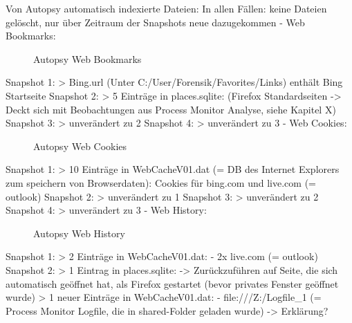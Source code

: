 Von Autopsy automatisch indexierte Dateien: 
In allen Fällen: keine Dateien gelöscht, nur über Zeitraum der Snapshots neue dazugekommen
- Web Bookmarks:
	\begin{figure}[h!]
		\centerline{}
		\label{chart:final-criteria}  
		\caption{Autopsy Web Bookmarks}
	\end{figure}
	Snapshot 1:
		> Bing.url (Unter C:/User/Forensik/Favorites/Links) enthält Bing Startseite
	Snapshot 2:
		> 5 Einträge in places.sqlite: (Firefox Standardseiten -> Deckt sich mit Beobachtungen aus Process Monitor Analyse, siehe Kapitel X)
	Snapshot 3:
		> unverändert zu 2
	Snapshot 4:
		> unverändert zu 3
- Web Cookies:
	\begin{figure}[h!]
		\centerline{}
		\label{chart:final-criteria}  
		\caption{Autopsy Web Cookies}
	\end{figure}
	Snapshot 1:
		> 10 Einträge in WebCacheV01.dat (= DB des Internet Explorers zum speichern von Browserdaten): Cookies für bing.com und live.com (= outlook)
	Snapshot 2:
		> unverändert zu 1
	Snapshot 3:
		> unverändert zu 2
	Snapshot 4:
		> unverändert zu 3
- Web History:
	\begin{figure}[h!]
		\centerline{}
		\label{chart:final-criteria}  
		\caption{Autopsy Web History}
	\end{figure}
	Snapshot 1:
		> 2 Einträge in WebCacheV01.dat:
			- 2x live.com (= outlook)
	Snapshot 2:
		> 1 Eintrag in places.sqlite: %
			-> Zurückzuführen auf Seite, die sich automatisch geöffnet hat, als Firefox gestartet (bevor privates Fenster geöffnet wurde)
		> 1 neuer Einträge in WebCacheV01.dat:
			- file:///Z:/Logfile\_1 (= Process Monitor Logfile, die in shared-Folder geladen wurde) -> Erklärung?
